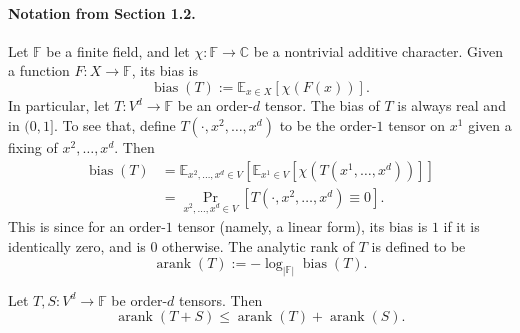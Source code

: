 
\paragraph{Notation from Section 1.2.}
Let $\mathbb F$ be a finite field, and let $\chi:\mathbb F\to\mathbb C$ be a nontrivial additive character. Given a function $F:X\to\mathbb F$, its bias is
\[
\operatorname{bias}(T):=\mathbb E_{x\in X}[\chi(F(x))].
\]
In particular, let $T:V^d\to\mathbb F$ be an order-$d$ tensor. The bias of $T$ is always real and in $(0,1]$. To see that, define $T(\cdot,x^2,\ldots,x^d)$ to be the order-$1$ tensor on $x^1$ given a fixing of $x^2,\ldots,x^d$. Then
\begin{align*}
\operatorname{bias}(T)&=\mathbb E_{x^2,\ldots,x^d\in V}\left[\mathbb E_{x^1\in V}[\chi(T(x^1,\ldots,x^d))]\right]\\
&=\Pr_{x^2,\ldots,x^d\in V}[T(\cdot,x^2,\ldots,x^d)\equiv0]. \tag{1}
\end{align*}
This is since for an order-$1$ tensor (namely, a linear form), its bias is $1$ if it is identically zero, and is $0$ otherwise. The analytic rank of $T$ is defined to be
\[
\operatorname{arank}(T):=-\log_{|\mathbb F|}\operatorname{bias}(T).
\]
\begin{theorem}[1.5]
Let $T,S:V^d\to\mathbb F$ be order-$d$ tensors. Then
\[
\operatorname{arank}(T+S)\leq\operatorname{arank}(T)+\operatorname{arank}(S).
\]
\end{theorem}
